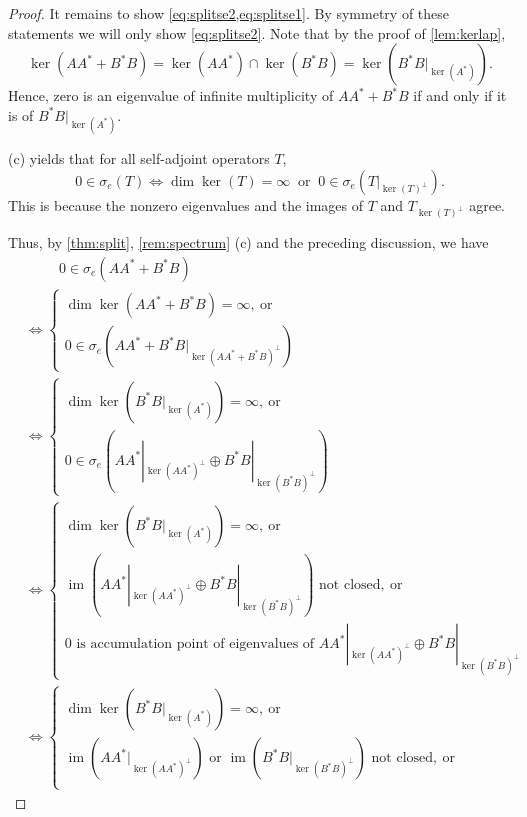 \documentclass[11pt]{article}
\theoremstyle{definition}
\theoremstyle{remark}
\DeclareMathOperator{\im}{im}
\begin{document}
\begin{proof}
    It remains to show \cref{eq:splitse2,eq:splitse1}. By symmetry of these statements we will only show \cref{eq:splitse2}. Note that by the proof of \cref{lem:kerlap}, 
    $$
    \ker(AA^*+B^*B)=\ker(AA^*)\cap \ker(B^*B) = \ker(B^*B|_{\ker(A^*)}).
    $$ 
    Hence, zero is an eigenvalue of infinite multiplicity of $AA^*+B^*B$ if and only if it is of $B^*B|_{\ker(A^*)}$.
    
    (c) yields that for all self-adjoint operators $T$,
    $$
    0 \in \sigma_e(T) \Leftrightarrow \dim \ker (T)=\infty \ \text{  or  }\ 0 \in \sigma_e(T|_{\ker(T)^\perp}).
    $$
    This is because the nonzero eigenvalues and the images of $T$ and $T_{\ker(T)^\perp}$ agree.
    
    Thus, by \cref{thm:split}, \cref{rem:spectrum} (c) and the preceding discussion, we have
    \begin{align*}
        &\qquad\ \  0 \in \sigma_e(AA^*+B^*B)\\ &\Leftrightarrow
        \left\{
      \begin{array}{l}
        \dim \ker (AA^*+B^*B)=\infty, \ \text{or}\\
        0 \in \sigma_e(AA^*+B^*B|_{\ker(AA^*+B^*B)^\perp})
      \end{array}
    \right.  \\
        &\Leftrightarrow 
    \left\{
      \begin{array}{l}
        \dim \ker (B^*B|_{\ker(A^*)})=\infty,\  \text{or}\\
        0 \in \sigma_e(AA^*|_{\ker(AA^*)^\perp}\oplus B^*B|_{\ker(B^*B)^\perp})
      \end{array}
    \right. \\
    &\Leftrightarrow 
    \left\{
      \begin{array}{l}
        \dim \ker (B^*B|_{\ker(A^*)})=\infty,\  \text{or}\\
        \im(AA^*|_{\ker(AA^*)^\perp}\oplus B^*B|_{\ker(B^*B)^\perp}) \text{ not closed},\  \text{or}\\
        0 \text{ is accumulation point of eigenvalues of } AA^*|_{\ker(AA^*)^\perp}\oplus B^*B|_{\ker(B^*B)^\perp}
      \end{array}
    \right. \\
    &\Leftrightarrow 
    \left\{
      \begin{array}{l}
        \dim \ker (B^*B|_{\ker(A^*)})=\infty,\  \text{or}\\
        \im(AA^*|_{\ker(AA^*)^\perp}) \text{ or } \im(B^*B|_{\ker(B^*B)^\perp}) \text{ not closed},\  \text{or}\\

\end{array}
\end{align*}
\end{proof}
\end{document}
